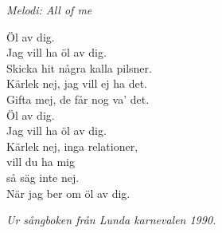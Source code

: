 {\footnotesize\textit{Melodi: All of me}}\par
\vspace{10pt}
Öl av dig.\\
Jag vill ha öl av dig.\\
Skicka hit några kalla pilsner.\\
Kärlek nej, jag vill ej ha det.\\
Gifta mej, de får nog va' det.\\
Öl av dig.\\
Jag vill ha öl av dig.\\
Kärlek nej, inga relationer,\\
vill du ha mig\\
så säg inte nej.\\
När jag ber om öl av dig.\par
\vspace{10pt}
{\footnotesize\textit{Ur sångboken från Lunda karnevalen 1990.}}
